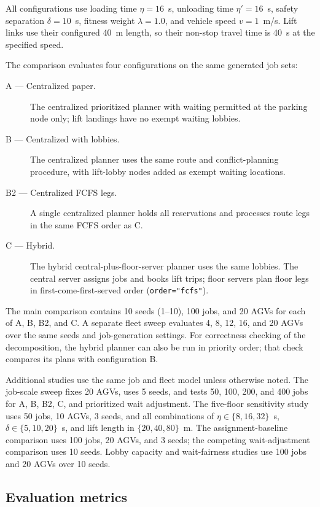All configurations use loading time $\eta=16$~s, unloading time
$\eta'=16$~s, safety separation $\delta=10$~s, fitness weight $\lambda=1.0$,
and vehicle speed $v=1$~m/s. Lift links use their configured 40~m length, so
their non-stop travel time is 40~s at the specified speed.

The comparison evaluates four configurations on the same generated job sets:
\begin{description}
  \item[A --- Centralized paper.] The centralized prioritized planner with
        waiting permitted at the parking node only; lift landings have no
        exempt waiting lobbies.
  \item[B --- Centralized with lobbies.] The centralized planner uses the
        same route and conflict-planning procedure, with lift-lobby nodes
        added as exempt waiting locations.
  \item[B2 --- Centralized FCFS legs.] A single centralized planner holds all
        reservations and processes route legs in the same FCFS order as C.
  \item[C --- Hybrid.] The hybrid central-plus-floor-server planner uses the
        same lobbies. The central server assigns jobs and books lift trips;
        floor servers plan floor legs in first-come-first-served order
        (\texttt{order="fcfs"}).
\end{description}

The main comparison contains 10 seeds (1--10), 100 jobs, and 20 AGVs for each
of A, B, B2, and C. A separate fleet sweep evaluates 4, 8, 12, 16, and 20
AGVs over the same seeds and job-generation settings. For correctness
checking of the decomposition, the hybrid planner can also be run in priority
order; that check compares its plans with configuration B.

Additional studies use the same job and fleet model unless otherwise noted.
The job-scale sweep fixes 20 AGVs, uses 5 seeds, and tests 50, 100, 200, and
400 jobs for A, B, B2, C, and prioritized wait adjustment. The five-floor
sensitivity study uses 50 jobs, 10 AGVs, 3 seeds, and all combinations of
$\eta\in\{8,16,32\}$~s, $\delta\in\{5,10,20\}$~s, and lift length in
$\{20,40,80\}$~m. The assignment-baseline comparison uses 100 jobs, 20 AGVs,
and 3 seeds; the competing wait-adjustment comparison uses 10 seeds. Lobby
capacity and wait-fairness studies use 100 jobs and 20 AGVs over 10 seeds.

\subsection{Evaluation metrics}

